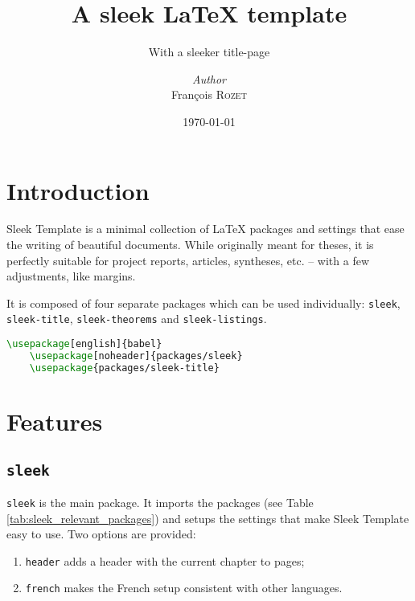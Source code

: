 \documentclass[a4paper, 12pt]{report}
\institute{Random University}
\title{A sleek \LaTeX{} template}
\subtitle{With a sleeker title-page}
\author{\textit{Author}\\François \textsc{Rozet}}
\date{\today}
\begin{document}
    \maketitle
    \romantableofcontents

    \chapter{Introduction}

    Sleek Template is a minimal collection of \LaTeX{} packages and settings that ease the writing of beautiful documents. While originally meant for theses, it is perfectly suitable for project reports, articles, syntheses, etc. -- with a few adjustments, like margins.

    It is composed of four separate packages which can be used individually: \texttt{sleek}, \texttt{sleek-title}, \texttt{sleek-theorems} and \texttt{sleek-listings}.

    \begin{lstlisting}[style=ruled, language=latex, caption={Example of Sleek Template packages usage.}, gobble=4]
    \usepackage[english]{babel}
    \usepackage[noheader]{packages/sleek}
    \usepackage{packages/sleek-title}
    \end{lstlisting}


    \chapter{Features}

    \section{\texttt{sleek}}

    \texttt{sleek} is the main package. It imports the packages (see Table \ref{tab:sleek_relevant_packages}) and setups the settings that make Sleek Template easy to use. Two options are provided:

    \begin{enumerate}[noitemsep]
        \item \texttt{header} adds a header with the current chapter to pages;
        \item \texttt{french} makes the French setup consistent with other languages.
    \end{enumerate}
\end{document}
